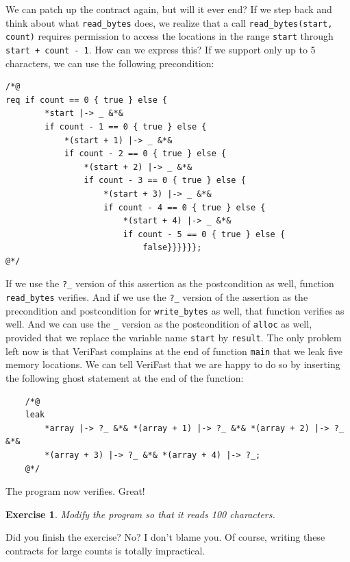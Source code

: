 \documentclass{article}
\newtheorem{exercise}{Exercise}
\begin{document}
We can patch up the contract again, but will it ever end? If we step back and think about what \lstinline!read_bytes! does, we realize that
a call \lstinline!read_bytes(start, count)! requires permission to access the locations in the range \lstinline!start! through \lstinline!start + count - 1!.
How can we express this? If we support only up to 5 characters, we can use the following precondition:
\begin{lstlisting}
/*@
req if count == 0 { true } else {
        *start |-> _ &*&
        if count - 1 == 0 { true } else {
            *(start + 1) |-> _ &*&
            if count - 2 == 0 { true } else {
                *(start + 2) |-> _ &*&
                if count - 3 == 0 { true } else {
                    *(start + 3) |-> _ &*&
                    if count - 4 == 0 { true } else {
                        *(start + 4) |-> _ &*&
                        if count - 5 == 0 { true } else {
                            false}}}}}};
@*/
\end{lstlisting}
If we use the \lstinline|?_| version of this assertion as the postcondition as well, function \lstinline!read_bytes! verifies.
And if we use the \lstinline|?_| version of the assertion as the precondition and postcondition for \lstinline!write_bytes! as well, that function verifies as well.
And we can use the \lstinline|_| version as the postcondition of \lstinline!alloc! as well, provided that we
replace the variable name \lstinline!start! by \lstinline!result!.
The only problem left now is that VeriFast complains at the end of function \lstinline!main! that
we leak five memory locations. We can tell VeriFast that we are happy to do so by inserting the following
ghost statement at the end of the function:
\begin{lstlisting}
    /*@
    leak
        *array |-> ?_ &*& *(array + 1) |-> ?_ &*& *(array + 2) |-> ?_ &*&
        *(array + 3) |-> ?_ &*& *(array + 4) |-> ?_;
    @*/
\end{lstlisting}
The program now verifies. Great!
\begin{exercise}\label{exercise:bytes}
Modify the program so that it reads 100 characters.
\end{exercise}
Did you finish the exercise? No? I don't blame you. Of course, writing these contracts for large counts is totally impractical.
\end{document}
